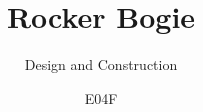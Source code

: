 \documentclass{layout/tudelft-report}
\begin{document}
\frontmatter

\title{Rocker Bogie}
\subtitle{Design and Construction} %
\author{E04F}
\subject{Aerospace Engineering}

\makecover







\tableofcontents


\listoffigures
\listoftables

\mainmatter














\appendix









\end{document}

